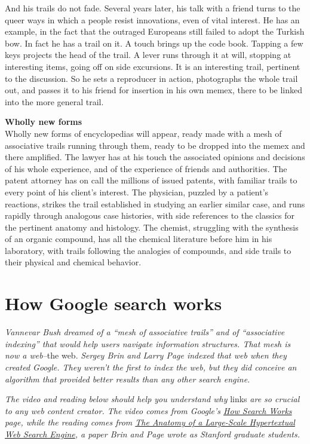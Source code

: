 \documentclass[]{book}
\theoremstyle{definition}
\theoremstyle{definition}
\theoremstyle{definition}
\theoremstyle{remark}
\begin{document}
And his trails do not fade. Several years later, his talk with a friend
turns to the queer ways in which a people resist innovations, even of
vital interest. He has an example, in the fact that the outraged
Europeans still failed to adopt the Turkish bow. In fact he has a trail
on it. A touch brings up the code book. Tapping a few keys projects the
head of the trail. A lever runs through it at will, stopping at
interesting items, going off on side excursions. It is an interesting
trail, pertinent to the discussion. So he sets a reproducer in action,
photographs the whole trail out, and passes it to his friend for
insertion in his own memex, there to be linked into the more general
trail.

\textbf{Wholly new forms}\\
Wholly new forms of encyclopedias will appear, ready made with a mesh of
associative trails running through them, ready to be dropped into the
memex and there amplified. The lawyer has at his touch the associated
opinions and decisions of his whole experience, and of the experience of
friends and authorities. The patent attorney has on call the millions of
issued patents, with familiar trails to every point of his client's
interest. The physician, puzzled by a patient's reactions, strikes the
trail established in studying an earlier similar case, and runs rapidly
through analogous case histories, with side references to the classics
for the pertinent anatomy and histology. The chemist, struggling with
the synthesis of an organic compound, has all the chemical literature
before him in his laboratory, with trails following the analogies of
compounds, and side trails to their physical and chemical behavior.

\hypertarget{how-google-search-works}{%
\section{How Google search works}\label{how-google-search-works}}

\emph{Vannevar Bush dreamed of a ``mesh of associative trails'' and of
``associative indexing'' that would help users navigate information
structures. That mesh is now a web--}the web. \emph{Sergey Brin and
Larry Page indexed that web when they created Google. They weren't the
first to index the web, but they did conceive an algorithm that provided
better results than any other search engine.}

\emph{The video and reading below should help you understand why }links
\emph{are so crucial to any web content creator. The video comes from
Google's
\href{https://www.google.com/search/howsearchworks/crawling-indexing/}{How
Search Works} page, while the reading comes from
\href{http://infolab.stanford.edu/~backrub/google.html}{The Anatomy of a
Large-Scale Hypertextual Web Search Engine}, a paper Brin and Page wrote
as Stanford graduate students.}
\end{document}
